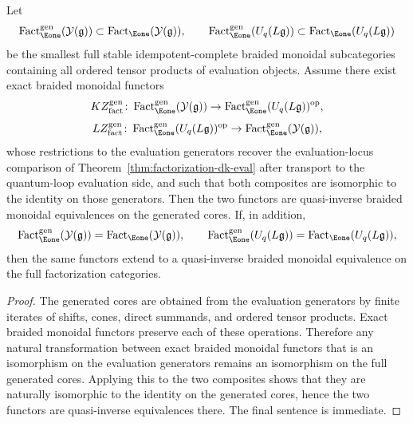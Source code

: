 \begin{proposition}
\label{prop:yangian-dk3-generated-core}
Let
\[
\operatorname{Fact}_{\Eone}^{\mathrm{gen}}(\mathcal{Y}(\mathfrak{g}))
\subset \operatorname{Fact}_{\Eone}(\mathcal{Y}(\mathfrak{g})),
\qquad
\operatorname{Fact}_{\Eone}^{\mathrm{gen}}(U_q(L\mathfrak{g}))
\subset \operatorname{Fact}_{\Eone}(U_q(L\mathfrak{g}))
\]
be the smallest full stable idempotent-complete braided monoidal
subcategories containing all ordered tensor products of evaluation
objects. Assume there exist exact braided monoidal functors
\[
KZ_{\mathrm{fact}}^{\mathrm{gen}}\colon
\operatorname{Fact}_{\Eone}^{\mathrm{gen}}(\mathcal{Y}(\mathfrak{g}))
\to
\operatorname{Fact}_{\Eone}^{\mathrm{gen}}(U_q(L\mathfrak{g}))^{\mathrm{op}},
\]
\[
LZ_{\mathrm{fact}}^{\mathrm{gen}}\colon
\operatorname{Fact}_{\Eone}^{\mathrm{gen}}(U_q(L\mathfrak{g}))^{\mathrm{op}}
\to
\operatorname{Fact}_{\Eone}^{\mathrm{gen}}(\mathcal{Y}(\mathfrak{g})),
\]
whose restrictions to the evaluation generators recover the
evaluation-locus comparison of
Theorem~\ref{thm:factorization-dk-eval} after transport to the
quantum-loop evaluation side, and such that both composites are
isomorphic to the identity on those generators. Then the two functors
are quasi-inverse braided monoidal equivalences on the generated cores.
If, in addition,
\[
\operatorname{Fact}_{\Eone}^{\mathrm{gen}}(\mathcal{Y}(\mathfrak{g}))
=
\operatorname{Fact}_{\Eone}(\mathcal{Y}(\mathfrak{g})),
\qquad
\operatorname{Fact}_{\Eone}^{\mathrm{gen}}(U_q(L\mathfrak{g}))
=
\operatorname{Fact}_{\Eone}(U_q(L\mathfrak{g})),
\]
then the same functors extend to a quasi-inverse braided monoidal
equivalence on the full factorization categories.
\end{proposition}

\begin{proof}
The generated cores are obtained from the evaluation generators by
finite iterates of shifts, cones, direct summands, and ordered tensor
products. Exact braided monoidal functors preserve each of these
operations. Therefore any natural transformation between exact
braided monoidal functors that is an isomorphism on the evaluation
generators remains an isomorphism on the full generated cores. Applying
this to the two composites shows that they are naturally isomorphic to
the identity on the generated cores, hence the two functors are
quasi-inverse equivalences there. The final sentence is immediate.
\end{proof}


